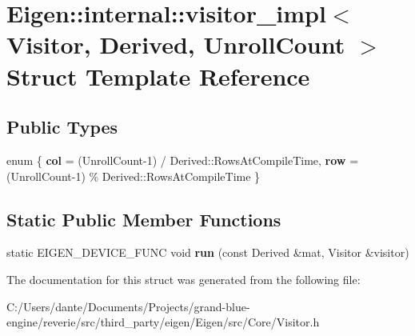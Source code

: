 \hypertarget{struct_eigen_1_1internal_1_1visitor__impl}{}\section{Eigen\+::internal\+::visitor\+\_\+impl$<$ Visitor, Derived, Unroll\+Count $>$ Struct Template Reference}
\label{struct_eigen_1_1internal_1_1visitor__impl}
\subsection*{Public Types}
\begin{DoxyCompactItemize}
\item 
\mbox{\label{struct_eigen_1_1internal_1_1visitor__impl_ad38170a996713616ef1aa28561cfb110}} 
enum \{ {\bfseries col} = (Unroll\+Count-\/1) / Derived\+::Rows\+At\+Compile\+Time, 
{\bfseries row} = (Unroll\+Count-\/1) \% Derived\+::Rows\+At\+Compile\+Time
 \}
\end{DoxyCompactItemize}
\subsection*{Static Public Member Functions}
\begin{DoxyCompactItemize}
\item 
\mbox{\label{struct_eigen_1_1internal_1_1visitor__impl_a9c4ba34851f1039623bbb8fef1db8513}} 
static E\+I\+G\+E\+N\+\_\+\+D\+E\+V\+I\+C\+E\+\_\+\+F\+U\+NC void {\bfseries run} (const Derived \&mat, Visitor \&visitor)
\end{DoxyCompactItemize}


The documentation for this struct was generated from the following file\+:\begin{DoxyCompactItemize}
\item 
C\+:/\+Users/dante/\+Documents/\+Projects/grand-\/blue-\/engine/reverie/src/third\+\_\+party/eigen/\+Eigen/src/\+Core/Visitor.\+h\end{DoxyCompactItemize}
